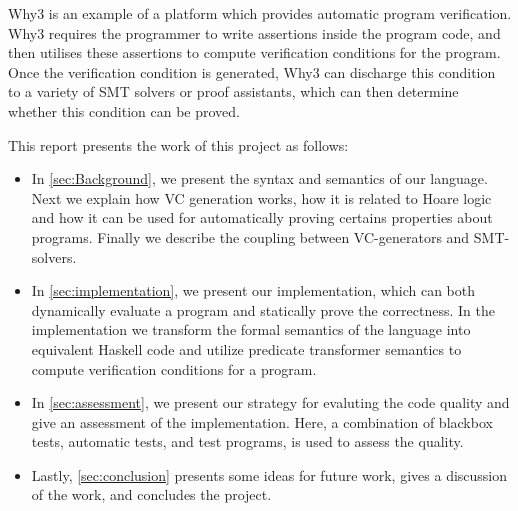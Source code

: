 

Why3 is an example of a platform which provides automatic program verification.
Why3 requires the programmer to write assertions inside the program code, and then utilises these assertions to compute verification conditions for the program.
Once the verification condition is generated, Why3 can discharge this condition to a variety of SMT solvers or proof assistants, which can then determine whether this condition can be proved.


This report presents the work of this project as follows:

\begin{itemize}
  \item In \cref{sec:Background}, we present the syntax and semantics of our language.
  Next we explain how VC generation works, how it is related to Hoare logic and how it can be used for automatically proving certains properties about programs. Finally we describe the coupling between VC-generators and SMT-solvers.
\item In \cref{sec:implementation}, we present our implementation, which can both dynamically evaluate a program and statically prove the correctness.
In the implementation we transform the formal semantics of the language into equivalent Haskell code and utilize predicate transformer semantics to compute verification conditions for a program.
\item In \cref{sec:assessment}, we present our strategy for evaluting the code quality and give an assessment of the implementation.
 Here, a combination of blackbox tests, automatic tests, and test programs, is used to assess the quality.
\item Lastly, \cref{sec:conclusion} presents some ideas for future work, gives a discussion of the work, and concludes the project.
\end{itemize}

